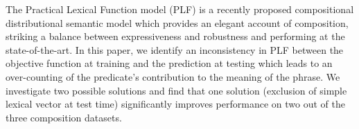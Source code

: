 The Practical Lexical Function model (PLF) is a recently proposed compositional distributional semantic model which provides an elegant account of composition, striking a balance between expressiveness and robustness and performing at the state-of-the-art. In this paper, we identify an inconsistency in PLF between the objective function at training and the prediction at testing which leads to an over-counting of the predicate's contribution to the meaning of the phrase. We investigate two possible solutions and find that one solution (exclusion of simple lexical vector at test time) significantly improves performance on two out of the three composition datasets.
